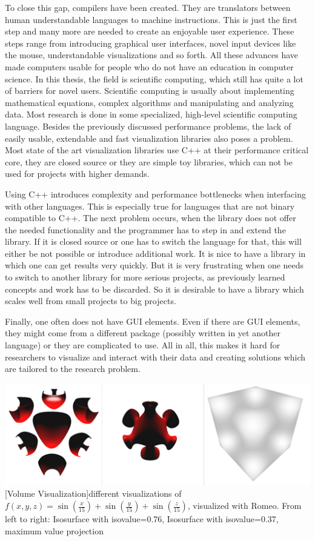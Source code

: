 To close this gap, compilers have been created. They are translators between human understandable languages to machine instructions.
This is just the first step and many more are needed to create an enjoyable user experience.
These steps range from introducing graphical user interfaces, novel input devices like the mouse, understandable visualizations and so forth.
All these advances have made computers usable for people who do not have an education in computer science.
In this thesis, the field is scientific computing, which still has quite a lot of barriers for novel users.
Scientific computing is usually about implementing mathematical equations, complex algorithms and manipulating and analyzing data.
Most research is done in some specialized, high-level scientific computing language.
Besides the previously discussed performance problems, the lack of easily usable, extendable and fast visualization libraries also poses a problem.
Most state of the art visualization libraries use C++ at their performance critical core, they are closed source or they are simple toy libraries, which can not be used for projects with higher demands.

Using C++ introduces complexity and performance bottlenecks when interfacing with other languages. This is especially true for languages that are not binary compatible to C++. 
The next problem occurs, when the library does not offer the needed functionality and the programmer has to step in and extend the library. If it is closed source or one has to switch the language for that, this will either be not possible or introduce additional work. 
It is nice to have a library in which one can get results very quickly. 
But it is very frustrating when one needs to switch to another library for more serious projects, as previously learned concepts and work has to be discarded.
So it is desirable to have a library which scales well from small projects to big projects.

Finally, one often does not have GUI elements. 
Even if there are GUI elements, they might come from a different package (possibly written in yet another language) or they are complicated to use.
All in all, this makes it hard for researchers to visualize and interact with their data and creating solutions which are tailored to the research problem.

\vspace{1em}
\begin{minipage}{\linewidth}
    \centering
    \includegraphics[width=0.7\linewidth]{graphics/surfaces.png}
    [Volume Visualization]{different visualizations of $f(x,y,z)=\sin(\frac{x}{15})+\sin(\frac{y}{15})+\sin(\frac{z}{15})$, visualized with Romeo. From left to right: Isosurface with isovalue=0.76, Isosurface with isovalue=0.37, maximum value projection}
    \label{fig:volume}
\end{minipage}
\vspace{1em}

